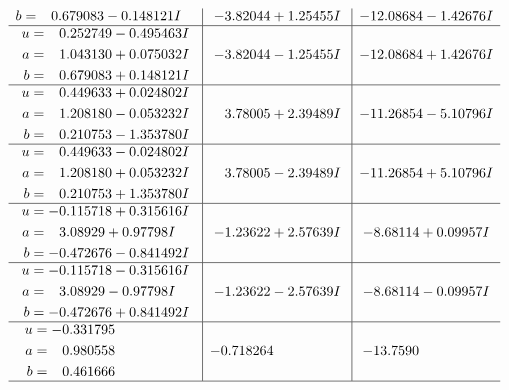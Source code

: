 \documentclass[1p]{elsarticle_modified}
\theoremstyle{definition}
\begin{document}
$$\begin{array}{c|c|c}
\begin{aligned}
b &= \phantom{-}0.679083 - 0.148121 I\end{aligned}
 & -3.82044 + 1.25455 I & -12.08684 - 1.42676 I \\ \hline\begin{aligned}
u &= \phantom{-}0.252749 - 0.495463 I \\
a &= \phantom{-}1.043130 + 0.075032 I \\
b &= \phantom{-}0.679083 + 0.148121 I\end{aligned}
 & -3.82044 - 1.25455 I & -12.08684 + 1.42676 I \\ \hline\begin{aligned}
u &= \phantom{-}0.449633 + 0.024802 I \\
a &= \phantom{-}1.208180 - 0.053232 I \\
b &= \phantom{-}0.210753 - 1.353780 I\end{aligned}
 & \phantom{-}3.78005 + 2.39489 I & -11.26854 - 5.10796 I \\ \hline\begin{aligned}
u &= \phantom{-}0.449633 - 0.024802 I \\
a &= \phantom{-}1.208180 + 0.053232 I \\
b &= \phantom{-}0.210753 + 1.353780 I\end{aligned}
 & \phantom{-}3.78005 - 2.39489 I & -11.26854 + 5.10796 I \\ \hline\begin{aligned}
u &= -0.115718 + 0.315616 I \\
a &= \phantom{-}3.08929 + 0.97798 I \\
b &= -0.472676 - 0.841492 I\end{aligned}
 & -1.23622 + 2.57639 I & -8.68114 + 0.09957 I \\ \hline\begin{aligned}
u &= -0.115718 - 0.315616 I \\
a &= \phantom{-}3.08929 - 0.97798 I \\
b &= -0.472676 + 0.841492 I\end{aligned}
 & -1.23622 - 2.57639 I & -8.68114 - 0.09957 I \\ \hline\begin{aligned}
u &= -0.331795\phantom{ +0.000000I} \\
a &= \phantom{-}0.980558\phantom{ +0.000000I} \\
b &= \phantom{-}0.461666\phantom{ +0.000000I}\end{aligned}
 & -0.718264\phantom{ +0.000000I} & -13.7590\phantom{ +0.000000I}\\
 \hline 
 \end{array}$$\newpage\newpage\renewcommand{\arraystretch}{1}
\end{document}
